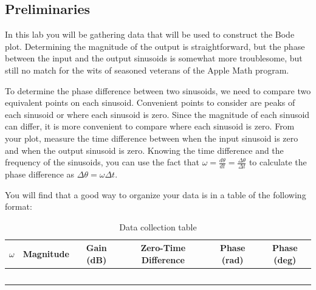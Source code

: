\subsection{Preliminaries}

In this lab you will be gathering data that will be used to construct the
Bode plot.  Determining the magnitude of the output is straightforward, but
the phase between the input and the output sinusoids is somewhat more
troublesome, but still no match for the wits of seasoned veterans of the
Apple Math program.

To determine the phase difference between two sinusoids, we need to compare
two equivalent points on each sinusoid. Convenient points to consider are
peaks of each sinusoid or where each sinusoid is zero.  Since the magnitude
of each sinusoid can differ, it is more convenient to compare where each
sinusoid is zero. From your plot, measure the time difference between when
the input sinusoid is zero and when the output sinusoid is zero.  Knowing the
time difference and the frequency of the sinusoids, you can use the fact that
\(\omega=\frac{d\theta}{dt}=\frac{\Delta\theta}{\Delta t}\) to calculate the
phase difference as \(\Delta\theta=\omega\Delta t\).

You will find that a good way to organize your data is in a table of the
following format:

\begin{table}[htbp]
    \centering
    \begin{tabular}{|c|c|c|c|c|c|}\hline %
        \(\omega \) & Magnitude   & Gain (dB) & Zero-Time Difference &
        Phase (rad) & Phase (deg)                                          \\\hline %
                    &             &           &                      &   & \\
                    &             &           &                      &   & \\
                    &             &           &                      &   & \\
                    &             &           &                      &   & \\
                    &             &           &                      &   & \\
        \hline %
    \end{tabular}
    \caption{Data collection table}
    \label{tab:Data} %
\end{table}%



